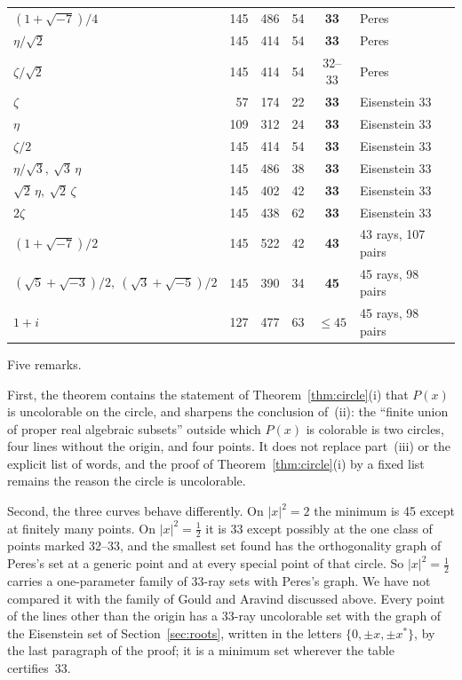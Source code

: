 \begin{table}[t]
\begin{tabular}{@{}lrrrcl@{}}
$(1+\sqrt{-7})/4$ & 145 & 486 & 54 & \textbf{33} & Peres \\
$\eta/\sqrt2$ & 145 & 414 & 54 & \textbf{33} & Peres \\
$\zeta/\sqrt2$ & 145 & 414 & 54 & 32--33 & Peres \\
$\zeta$ & 57 & 174 & 22 & \textbf{33} & Eisenstein 33 \\
$\eta$ & 109 & 312 & 24 & \textbf{33} & Eisenstein 33 \\
$\zeta/2$ & 145 & 414 & 54 & \textbf{33} & Eisenstein 33 \\
$\eta/\sqrt3,\ \sqrt3\,\eta$ & 145 & 486 & 38 & \textbf{33} & Eisenstein 33 \\
$\sqrt2\,\eta,\ \sqrt2\,\zeta$ & 145 & 402 & 42 & \textbf{33} & Eisenstein 33 \\
$2\zeta$ & 145 & 438 & 62 & \textbf{33} & Eisenstein 33 \\
$(1+\sqrt{-7})/2$ & 145 & 522 & 42 & \textbf{43} & 43 rays, 107 pairs \\
$(\sqrt5+\sqrt{-3})/2,\ (\sqrt3+\sqrt{-5})/2$ & 145 & 390 & 34 & \textbf{45} & 45 rays, 98 pairs \\
$1+i$ & 127 & 477 & 63 & $\le45$ & 45 rays, 98 pairs \\
\bottomrule
\end{tabular}
\end{table}

Five remarks.

First, the theorem contains the statement of Theorem~\ref{thm:circle}(i) that $P(x)$ is
uncolorable on the circle, and sharpens the conclusion of~(ii): the
``finite union of proper real algebraic subsets'' outside which $P(x)$ is colorable is two
circles, four lines without the origin, and four points.  It does not replace part~(iii) or the explicit list of
words, and the proof of Theorem~\ref{thm:circle}(i) by a fixed list remains the reason the
circle is uncolorable.

Second, the three curves behave differently.  On $|x|^2=2$ the minimum is 45 except at
finitely many points.  On $|x|^2=\tfrac12$ it is 33 except possibly at the one class of
points marked 32--33, and the smallest set found has the orthogonality graph of Peres's set at
a generic point and at every special point of that circle.  So $|x|^2=\tfrac12$ carries a
one-parameter family of 33-ray sets with Peres's graph.  We have not compared it with the family
of Gould and Aravind discussed above.  Every point of the lines other than the origin has a
33-ray uncolorable set with the graph of the Eisenstein set of Section~\ref{sec:roots}, written
in the letters $\{0,\pm x,\pm x^{*}\}$, by the last paragraph of the proof; it is a minimum set
wherever the table certifies~33.

